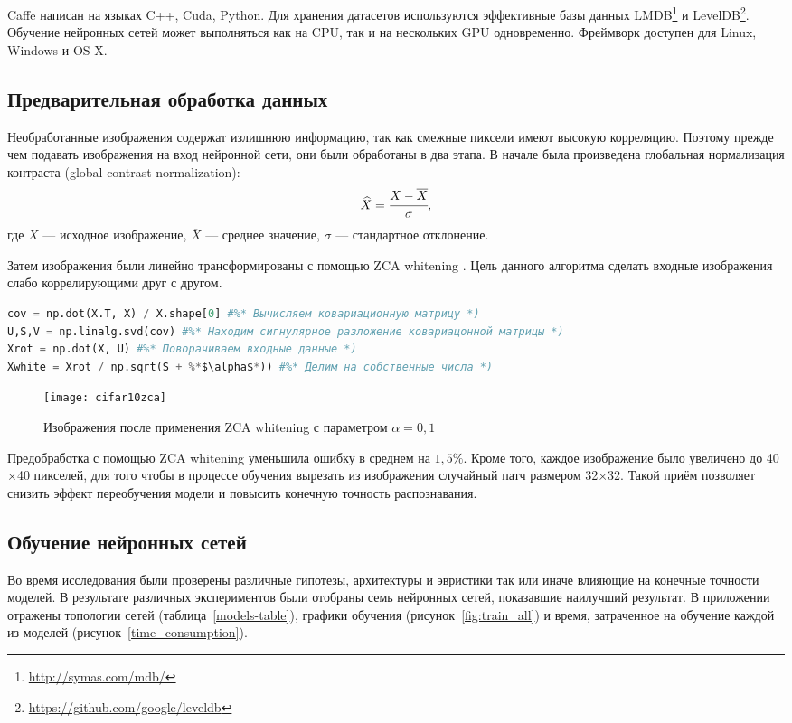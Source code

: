 Caffe написан на языках C++, Cuda, Python. Для хранения датасетов используются эффективные базы данных 
LMDB\footnote{\url{http://symas.com/mdb/}} и LevelDB\footnote{\url{https://github.com/google/leveldb}}. Обучение нейронных сетей 
может выполняться как на CPU, так и на нескольких GPU одновременно. Фреймворк доступен для Linux, Windows и OS X.

\subsection{Предварительная обработка данных}
Необработанные изображения содержат излишнюю информацию, так как смежные пиксели имеют высокую корреляцию. Поэтому прежде чем 
подавать изображения на вход нейронной сети, они были обработаны в два этапа. В начале была произведена глобальная нормализация контраста
(global contrast normalization):
\[ \widehat{X} = \cfrac{X - \overline{X}}{\sigma},\]
где $X$ --- исходное изображение, $\overline{X}$ --- среднее значение, $\sigma$ --- стандартное отклонение.

Затем изображения были линейно трансформированы с помощью ZCA whitening \cite{learningmultiple}.
Цель данного алгоритма сделать входные изображения слабо коррелирующими друг с другом.

\begin{lstlisting}[language=Python, frame=TB, caption=Алгоритм ZCA whitening]
cov = np.dot(X.T, X) / X.shape[0] #%* Вычисляем ковариационную матрицу *)
U,S,V = np.linalg.svd(cov) #%* Находим сигнулярное разложение ковариацонной матрицы *)
Xrot = np.dot(X, U) #%* Поворачиваем входные данные *)
Xwhite = Xrot / np.sqrt(S + %*$\alpha$*)) #%* Делим на собственные числа *)
\end{lstlisting}
\vspace*{-0.4cm}
\begin{figure}[h]
    \centering
    \texttt{[image: cifar10zca]}
    \caption{Изображения после применения ZCA whitening с параметром $\alpha=0,1$}
\end{figure}
Предобработка с помощью ZCA whitening уменьшила ошибку в среднем на $1,5\%$. Кроме того, каждое изображение было
увеличено до 40$\times$40 пикселей, для того чтобы в процессе обучения вырезать из 
изображения случайный патч размером 32$\times$32. Такой приём позволяет снизить эффект переобучения модели и повысить конечную 
точность распознавания.

\subsection{Обучение нейронных сетей}
Во время исследования были проверены различные гипотезы, архитектуры и эвристики так или иначе влияющие на конечные точности 
моделей. В результате различных экспериментов были отобраны семь нейронных сетей, показавшие наилучший результат.
В приложении отражены топологии сетей (таблица~\ref{models-table}), графики обучения (рисунок~\ref{fig:train_all}) и время,
затраченное на обучение каждой из моделей (рисунок~\ref{time_consumption}).

